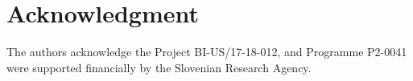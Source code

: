 \section*{Acknowledgment}

The authors acknowledge the Project BI-US/17-18-012, and Programme
P2-0041 were supported financially by the Slovenian Research Agency.

